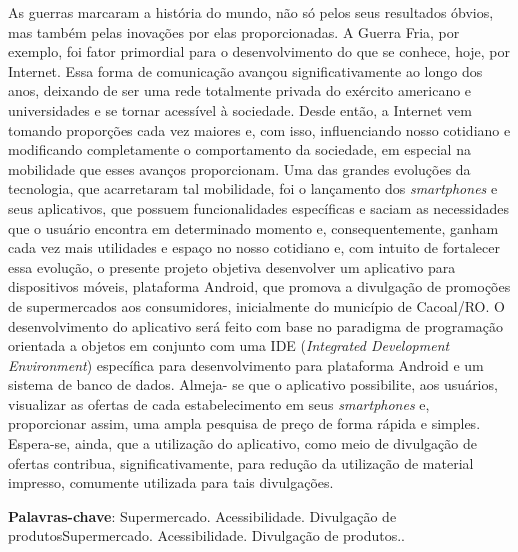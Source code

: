 \documentclass[article,12pt,onesidea,4paper,english,brazil]{abntex2}
\begin{document}
	\noindent As guerras marcaram a história do mundo, não só pelos seus resultados óbvios,	mas também pelas inovações por elas proporcionadas. A Guerra Fria, por exemplo, foi fator primordial para o desenvolvimento do que se conhece, hoje, por Internet.
	Essa forma de comunicação avançou significativamente ao longo dos anos,
	deixando de ser uma rede totalmente privada do exército americano e universidades
	e se tornar acessível à sociedade. Desde então, a Internet vem tomando proporções
	cada vez maiores e, com isso, influenciando nosso cotidiano e modificando
	completamente o comportamento da sociedade, em especial na mobilidade que
	esses avanços proporcionam. Uma das grandes evoluções da tecnologia, que
	acarretaram tal mobilidade, foi o lançamento dos \textit{smartphones} e seus aplicativos, que possuem funcionalidades específicas e saciam as necessidades que o usuário
	encontra em determinado momento e, consequentemente, ganham cada vez mais
	utilidades e espaço no nosso cotidiano e, com intuito de fortalecer essa evolução, o presente projeto objetiva desenvolver um aplicativo para dispositivos móveis,
	plataforma Android, que promova a divulgação de promoções de supermercados
	aos consumidores, inicialmente do município de Cacoal/RO. O desenvolvimento do
	aplicativo será feito com base no paradigma de programação orientada a objetos em
	conjunto com uma IDE (\textit{Integrated Development Environment}) específica para 
	desenvolvimento para plataforma Android e um sistema de banco de dados. Almeja-
	se que o aplicativo possibilite, aos usuários, visualizar as ofertas de cada	
	estabelecimento em seus \textit{smartphones} e, proporcionar assim, uma ampla pesquisa
	de preço de forma rápida e simples. Espera-se, ainda, que a utilização do aplicativo,
	como meio de divulgação de ofertas contribua, significativamente, para redução da
	utilização de material impresso, comumente utilizada para tais divulgações.
	
	\vspace{\onelineskip}
	
	\noindent
	\textbf{Palavras-chave}: Supermercado. Acessibilidade. Divulgação de produtosSupermercado. Acessibilidade. Divulgação de produtos..	
	
\end{document}
